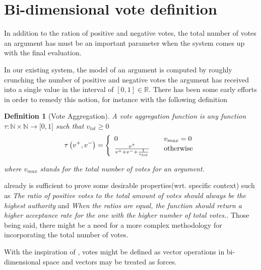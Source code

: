 \documentclass{article}
\newtheorem{definition}{Definition}
\begin{document}


\section{Bi-dimensional vote definition}
In addition to the ration of positive and negative votes, the total number of votes an argument has must be an important parameter when the system comes up with the final evaluation.

 In our existing system, the model of an argument is computed by roughly crunching  the number of positive and negative votes the argument has received into a single value in the interval of  $[0,1] \in \mathbb{R}$. There has been some early efforts in order to remedy this notion, for instance with the following definition

\begin{definition}
[Vote Aggregation]A vote aggregation function is any function
$\tau:%
\mathbb{N}
\times%
\mathbb{N}
\rightarrow\lbrack0,1]$ such that $v_{tot}\geq0$
\[
\tau\left(  v^{+},v^{-}\right)  =\left\{
\begin{array}
[c]{lll}%
0 &  & v_{max}=0\\
\frac{v^{+}}{v^{+}+v^{-}+\frac{1}{v_{tot}}} &  & \text{otherwise}%
\end{array}
\right.
\]

where $v_{max}$ stands for the total number of votes for an argument.
\end{definition}

already is sufficient to prove some desirable properties(wrt. specific context) such as \textit{The ratio of positive votes to the total amount of votes should always be the highest authority} and \textit{When the ratios are equal, the function should return a higher acceptance rate for the one with the higher number of total votes.}. Those being said, there might be a need for a more complex methodology for incorporating the total number of votes.

With the inspiration of \cite{DBLP:conf/clima/BaroniRTAB13}, votes might be defined as vector operations in bi-dimensional space and vectors may be treated as forces.
\end{document}
